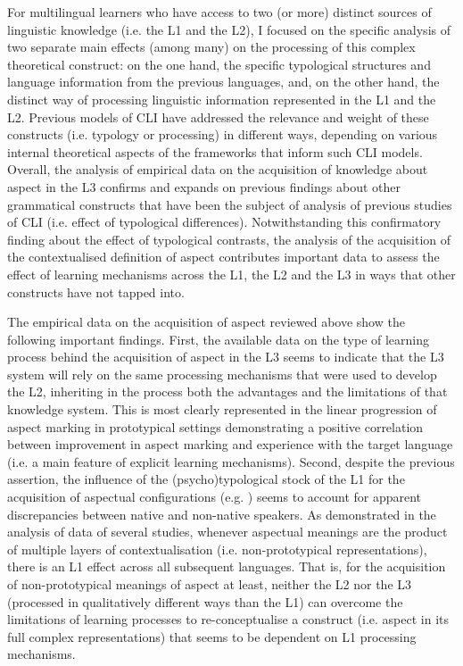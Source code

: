 \documentclass[output=paper,modfonts,nonflat,newtxmath]{langsci/langscibook}
\begin{document}
For multilingual learners who have access to two (or more) distinct sources of linguistic knowledge (i.e. the L1 and the L2), I focused on the specific analysis of two separate main effects (among many) on the processing of this complex theoretical construct: on the one hand, the specific typological structures and language information from the previous languages, and, on the other hand, the distinct way of processing linguistic information represented in the L1 and the L2. Previous models of CLI have addressed the relevance and weight of these constructs (i.e. typology or processing) in different ways, depending on various internal theoretical aspects of the frameworks that inform such CLI models. Overall, the analysis of empirical data on the acquisition of knowledge about aspect in the L3 confirms and expands on previous findings about other grammatical constructs that have been the subject of analysis of previous studies of CLI (i.e. effect of typological differences). Notwithstanding this confirmatory finding about the effect of typological contrasts, the analysis of the acquisition of the contextualised definition of aspect contributes important data to assess the effect of learning mechanisms across the L1, the L2 and the L3 in ways that other constructs have not tapped into.

The empirical data on the acquisition of aspect reviewed above show the following important findings. First, the available data on the type of learning process behind the acquisition of aspect in the L3 seems to indicate that the L3 system will rely on the same processing mechanisms that were used to develop the L2, inheriting in the process both the advantages and the limitations of that knowledge system. This is most clearly represented in the linear progression of aspect marking in prototypical settings demonstrating a positive correlation between improvement in aspect marking and experience with the target language (i.e. a main feature of explicit learning mechanisms). Second, despite the previous assertion, the influence of the (psycho)typological stock of the L1 for the acquisition of aspectual configurations (e.g. \citealt{Bylund2011, SchmiedtovaEtAl2011, AthanasopoulosEtAl2015}) seems to account for apparent discrepancies between native and non-native speakers. As demonstrated in the analysis of data of several studies, whenever aspectual meanings are the product of multiple layers of contextualisation (i.e. non-prototypical representations), there is an L1 effect across all subsequent languages. That is, for the acquisition of non-prototypical meanings of aspect at least, neither the L2 nor the L3 (processed in qualitatively different ways than the L1) can overcome the limitations of learning processes to re-conceptualise a construct (i.e. aspect in its full complex representations) that seems to be dependent on L1 processing mechanisms.
\end{document}
